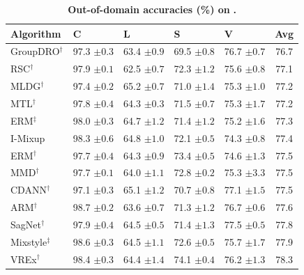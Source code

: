 \begin{table}[htbp]
\centering
\small
\renewcommand{\arraystretch}{1.1}
\caption{\textbf{Out-of-domain accuracies (\%) on} \textbf{.}}
\begin{tabular}{lllll|c}
\toprule
\textbf{Algorithm} & \textbf{C} & \textbf{L} & \textbf{S} & \textbf{V} & \textbf{Avg} \\
\midrule
GroupDRO$^\dagger$ & 97.3 \scriptsize$\pm0.3$ & 63.4 \scriptsize$\pm0.9$ & 69.5 \scriptsize$\pm0.8$ & 76.7 \scriptsize$\pm0.7$ & 76.7 \\
RSC$^\dagger$ & 97.9 \scriptsize$\pm0.1$ & 62.5 \scriptsize$\pm0.7$ & 72.3 \scriptsize$\pm1.2$ & 75.6 \scriptsize$\pm0.8$ & 77.1 \\
MLDG$^\dagger$ & 97.4 \scriptsize$\pm0.2$ & 65.2 \scriptsize$\pm0.7$ & 71.0 \scriptsize$\pm1.4$ & 75.3 \scriptsize$\pm1.0$ & 77.2 \\
MTL$^\dagger$ & 97.8 \scriptsize$\pm0.4$ & 64.3 \scriptsize$\pm0.3$ & 71.5 \scriptsize$\pm0.7$ & 75.3 \scriptsize$\pm1.7$ & 77.2 \\
ERM$^\ddagger$ & 98.0 \scriptsize$\pm0.3$ & 64.7 \scriptsize$\pm1.2$ & 71.4 \scriptsize$\pm1.2$ & 75.2 \scriptsize$\pm1.6$ & 77.3 \\
I-Mixup & 98.3 \scriptsize$\pm0.6$ & 64.8 \scriptsize$\pm1.0$ & 72.1 \scriptsize$\pm0.5$ & 74.3 \scriptsize$\pm0.8$ & 77.4 \\
ERM$^\dagger$ & 97.7 \scriptsize$\pm0.4$ & 64.3 \scriptsize$\pm0.9$ & 73.4 \scriptsize$\pm0.5$ & 74.6 \scriptsize$\pm1.3$ & 77.5 \\
MMD$^\dagger$ & 97.7 \scriptsize$\pm0.1$ & 64.0 \scriptsize$\pm1.1$ & 72.8 \scriptsize$\pm0.2$ & 75.3 \scriptsize$\pm3.3$ & 77.5 \\
CDANN$^\dagger$ & 97.1 \scriptsize$\pm0.3$ & 65.1 \scriptsize$\pm1.2$ & 70.7 \scriptsize$\pm0.8$ & 77.1 \scriptsize$\pm1.5$ & 77.5 \\
ARM$^\dagger$ & 98.7 \scriptsize$\pm0.2$ & 63.6 \scriptsize$\pm0.7$ & 71.3 \scriptsize$\pm1.2$ & 76.7 \scriptsize$\pm0.6$ & 77.6 \\
SagNet$^\dagger$ & 97.9 \scriptsize$\pm0.4$ & 64.5 \scriptsize$\pm0.5$ & 71.4 \scriptsize$\pm1.3$ & 77.5 \scriptsize$\pm0.5$ & 77.8 \\
Mixstyle$^\ddagger$ & 98.6 \scriptsize$\pm0.3$ & 64.5 \scriptsize$\pm1.1$ & 72.6 \scriptsize$\pm0.5$ & 75.7 \scriptsize$\pm1.7$ & 77.9 \\
VREx$^\dagger$ & 98.4 \scriptsize$\pm0.3$ & 64.4 \scriptsize$\pm1.4$ & 74.1 \scriptsize$\pm0.4$ & 76.2 \scriptsize$\pm1.3$ & 78.3 \\

\end{tabular}
\end{table}
